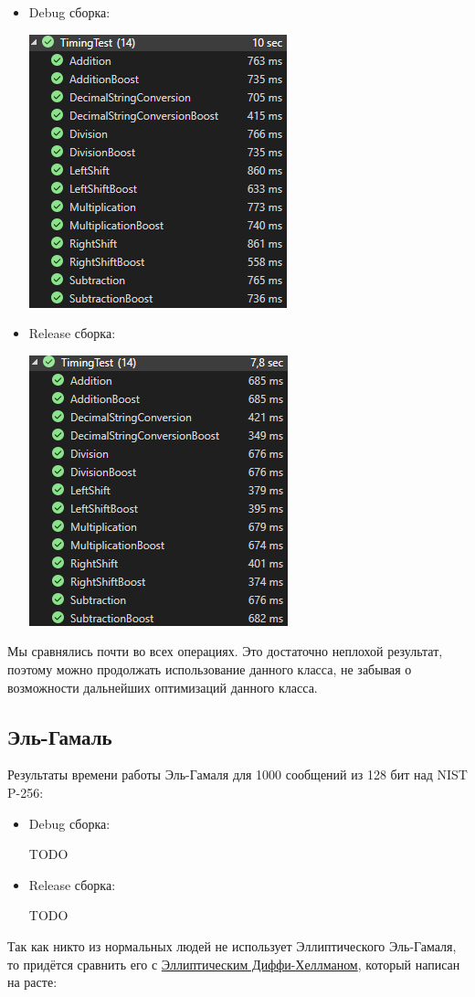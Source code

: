 \begin{itemize}
  \item Debug сборка:

  \begin{center}
     \includegraphics{images/uint_debug.png}
  \end{center}

  \item Release сборка:

  \begin{center}
     \includegraphics{images/uint_release.png}
  \end{center}
\end{itemize}

Мы сравнялись почти во всех операциях. Это достаточно неплохой результат, поэтому можно продолжать использование данного класса, не забывая о возможности дальнейших оптимизаций данного класса.

\subsection{Эль-Гамаль}
Результаты времени работы Эль-Гамаля для 1000 сообщений из 128 бит над NIST P-256:
\begin{itemize}
  \item Debug сборка:

    TODO

  \item Release сборка:

    TODO
\end{itemize}
Так как никто из нормальных людей не использует Эллиптического Эль-Гамаля, то придётся сравнить его с \href{https://github.com/RustCrypto/elliptic-curves/tree/master/p256}{Эллиптическим Диффи-Хеллманом}, который написан на расте:

